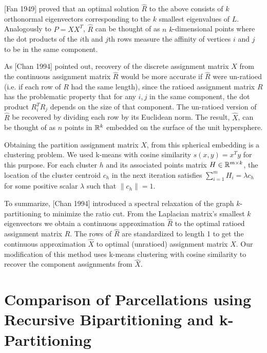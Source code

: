 [Fan 1949] proved that an optimal solution $\hat{R}$ to the above
consists of $k$ orthonormal eigenvectors corresponding to the $k$
smallest eigenvalues of $L$. Analogously to $P = X X^T$,
$\hat{R}$ can be thought of as $n$ $k$-dimensional points where the
dot products of the $i$th and $j$th rows measure the affinity of
vertices $i$ and $j$ to be in the same component.

As [Chan 1994] pointed out, recovery of the discrete assignment matrix
$X$ from the continuous assignment matrix $\hat{R}$ would be more
accurate if $\hat{R}$ were un-ratioed (i.e. if each row of $R$ had the
same length), since the ratioed assignment matrix $R$ has the
problematic property that for any $i,j$ in the same component, the dot product $R_i^T R_j$ depends on the size of that component.
The un-ratioed version of $\hat{R}$ be recovered by dividing each row
by its Euclidean norm. The result, $\hat{X}$, can be thought of as $n$
points in $\mathbb{R}^k$ embedded on the surface of the unit hypersphere.

Obtaining the partition assignment matrix $X$, from this spherical
embedding is a clustering problem. We used k-means with cosine
similarity $s(x,y) = x^T y$ for this purpose. For each cluster $h$
and its associated points matrix $H \in \mathbb{R}^{m \times k}$, the
location of the cluster centroid $c_h$ in the next iteration satisfies
$ \sum_{i=1}^m H_i = \lambda c_h $ for some positive scalar $\lambda$
such that $ \| c_h \| = 1$.

To summarize, [Chan 1994] introduced a spectral relaxation of the graph
$k$-partitioning to minimize the ratio cut. From the Laplacian matrix's
smallest $k$ eigenvectors we obtain a continuous approximation $\hat{R}$
to the optimal ratioed assignment matrix $R$. The rows of $\hat{R}$ are
standardized to length 1 to get the continuous approximation $\hat{X}$
to optimal (unratioed) assignment matrix $X$. Our modification of
this method uses k-means clustering with cosine similarity to recover
the component assignments from $\hat{X}$.

\section{Comparison of Parcellations using Recursive Bipartitioning
and k-Partitioning}

